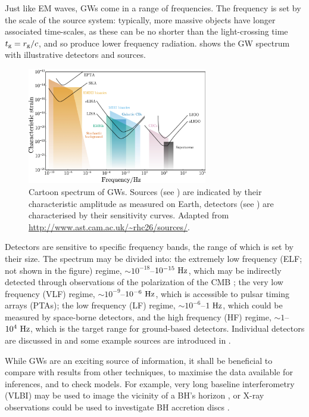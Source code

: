 Just like EM waves, GWs come in a range of frequencies. The frequency is set by the scale of the source system: typically, more massive objects have longer associated time-scales, as these can be no shorter than the light-crossing time $t_\mathrm{g} = r_\mathrm{g}/c$, and so produce lower frequency radiation.  shows the GW spectrum with illustrative detectors and sources. 
\begin{figure}
  \centering
  \includegraphics[width=0.7\textwidth]{./images/GW_spectrum}
    \caption{Cartoon spectrum of GWs. Sources (see ) are indicated by their characteristic amplitude as measured on Earth, detectors (see ) are characterised by their sensitivity curves. Adapted from \url{http://www.ast.cam.ac.uk/~rhc26/sources/}.}   
    \label{fig:spectrum} 
\end{figure}
Detectors are sensitive to specific frequency bands, the range of which is set by their size. The spectrum may be divided into: the extremely low frequency (ELF; not shown in the figure) regime, $\sim10^{-18}$--$10^{-15}~\mathrm{Hz}$, which may be indirectly detected through observations of the polarization of the CMB \citep[e.g.,][]{Hu1997,Kamionkowski1997}; the very low frequency (VLF) regime, $\sim10^{-9}$--$10^{-6}~\mathrm{Hz}$, which is accessible to pulsar timing arrays (PTAs); the low frequency (LF) regime, $\sim10^{-6}$--$1~\mathrm{Hz}$, which could be measured by space-borne detectors, and the high frequency (HF) regime, $\sim1$--$10^4~\mathrm{Hz}$, which is the target range for ground-based detectors. Individual detectors are discussed in  and some example sources are introduced in .

While GWs are an exciting source of information, it shall be beneficial to compare with results from other techniques, to maximise the data available for inferences, and to check models. For example, very long baseline interferometry (VLBI) may be used to image the vicinity of a BH's horizon \citep{Doeleman2008,Johannsen2012a}, or X-ray observations could be used to investigate BH accretion discs \citep{Psaltis2008}.

